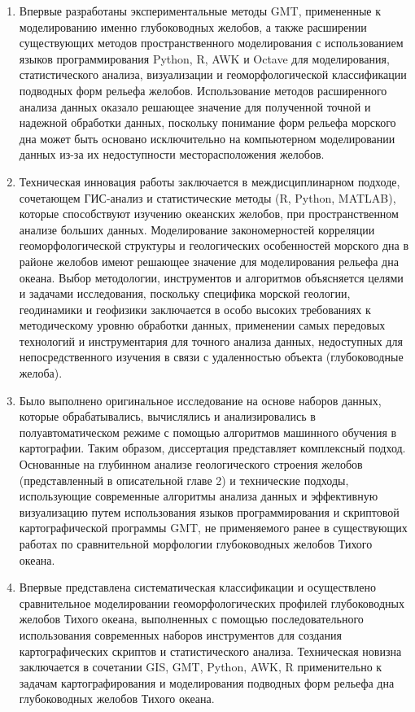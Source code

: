 {\novelty}
\begin{enumerate}[beginpenalty=10000] %
  \item Впервые разработаны экспериментальные методы GMT, примененные к моделированию именно глубоководных желобов, а также расширении существующих методов пространственного моделирования с использованием языков программирования Python, R, AWK и Octave для моделирования, статистического анализа, визуализации и геоморфологической классификации подводных форм рельефа желобов. Использование методов расширенного анализа данных оказало решающее значение для полученной точной и надежной обработки данных, поскольку понимание форм рельефа морского дна может быть основано исключительно на компьютерном моделировании данных из-за их недоступности месторасположения желобов. 

  \item Техническая инновация работы заключается в междисциплинарном подходе, сочетающем ГИС-анализ и статистические методы (R, Python, MATLAB), которые способствуют изучению океанских желобов, при пространственном анализе больших данных. Моделирование закономерностей корреляции геоморфологической структуры и геологических особенностей морского дна в районе желобов имеют решающее значение для моделирования рельефа дна океана. Выбор методологии, инструментов и алгоритмов объясняется целями и задачами исследования, поскольку специфика морской геологии, геодинамики и геофизики заключается в особо высоких требованиях к методическому уровню обработки данных, применении самых передовых технологий и инструментария для точного анализа данных, недоступных для непосредственного изучения в связи с удаленностью объекта (глубоководные желоба). 
  
\item Было выполнено оригинальное исследование на основе наборов данных, которые обрабатывались, вычислялись и анализировались в полуавтоматическом режиме с помощью алгоритмов машинного обучения в картографии. Таким образом, диссертация представляет комплексный подход. Основанные на глубинном анализе геологического строения желобов (представленный в описательной главе 2) и технические подходы, использующие современные алгоритмы анализа данных и эффективную визуализацию путем использования языков программирования и скриптовой картографической программы GMT, не применяемого ранее в существующих работах по сравнительной морфологии глубоководных желобов Тихого океана. 

\item Впервые представлена систематическая классификации и осуществлено сравнительное моделировании геоморфологических профилей глубоководных желобов Тихого океана, выполненных с помощью последовательного использования современных наборов инструментов для создания картографических скриптов и статистического анализа. Техническая новизна заключается в сочетании GIS, GMT, Python, AWK, R применительно к задачам картографирования и моделирования подводных форм рельефа дна глубоководных желобов Тихого океана.  
\end{enumerate}

